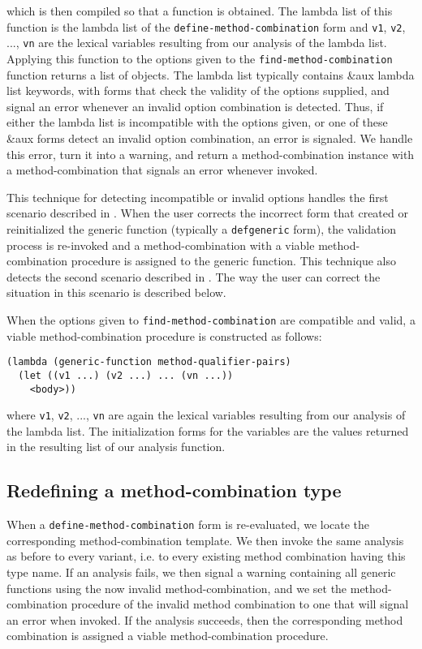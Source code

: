 which is then compiled so that a function is obtained.  The lambda
list of this function is the lambda list of the
\texttt{define-method-combination} form and \texttt{v1}, \texttt{v2},
..., \texttt{vn} are the lexical variables resulting from our analysis
of the lambda list.  Applying this function to the options given to
the \texttt{find-method-combination} function returns a list of
objects.  The lambda list typically
contains \&aux lambda list keywords, with forms that check the
validity of the options supplied, and signal an error whenever an
invalid option combination is detected.  Thus, if either the lambda
list is incompatible with the options given, or one of these \&aux
forms detect an invalid option combination, an error is signaled.  We
handle this error, turn it into a warning, and return a
method-combination instance with a method-combination that signals an
error whenever invoked.

This technique for detecting incompatible or invalid options handles
the first scenario described in .  When the
user corrects the incorrect form that created or reinitialized the
generic function (typically a \texttt{defgeneric} form), the
validation process is re-invoked and a method-combination with a
viable method-combination procedure is assigned to the generic
function.  This technique also detects the second scenario described
in .  The way the user can correct the
situation in this scenario is described below.

When the options given to \texttt{find-method-combination} are
compatible and valid, a viable method-combination procedure is
constructed as follows:

\begin{verbatim}
(lambda (generic-function method-qualifier-pairs)
  (let ((v1 ...) (v2 ...) ... (vn ...))
    <body>))
\end{verbatim}

where \texttt{v1}, \texttt{v2}, ..., \texttt{vn} are again the lexical
variables resulting from our analysis of the lambda list.  The
initialization forms for the variables are the values returned in the
resulting list of our analysis function.

\subsection{Redefining a method-combination type}

When a \texttt{define-method-combination} form is re-evaluated, we
locate the corresponding method-combination template.  We then invoke
the same analysis as before to every variant, i.e. to every existing
method combination having this type name.  If an analysis fails, we
then signal a warning containing all generic functions using the now
invalid method-combination, and we set the method-combination
procedure of the invalid method combination to one that will signal an
error when invoked.  If the analysis succeeds, then the corresponding
method combination is assigned a viable method-combination procedure.

